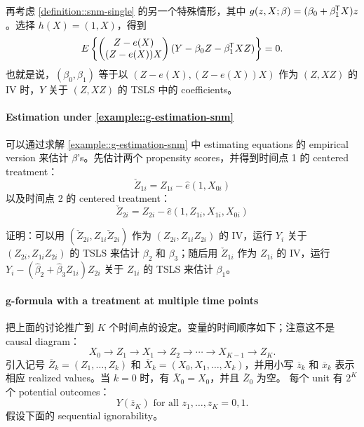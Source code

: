 再考虑 \cref{definition::snm-single} 的另一个特殊情形，其中 $g(z,X;\beta) = (\beta_0 + \beta_1^{\mkern-1.5mu\mathsf{T}} X) z$。选择 $h(X) = (1,X)$，得到
$$
E\left\{   \begin{pmatrix}
Z-e(X)\\
(Z-e(X)) X
\end{pmatrix}  
(Y-  \beta_0 Z - \beta_1^{\mkern-1.5mu\mathsf{T}} XZ) \right\}  = 0.
$$
也就是说，$(\beta_0,\beta_1)$ 等于以 $(Z-e(X),  (Z-e(X)) X )$ 作为 $(Z, XZ)$ 的 IV 时，$Y$ 关于 $(Z, XZ)$ 的 TSLS 中的 coefficients。



\paragraph{Estimation under \cref{example::g-estimation-snm}}\label{problem::snm-estimation-example}
 

可以通过求解 \cref{example::g-estimation-snm} 中 estimating equations 的 empirical version 来估计 $\beta$'s。先估计两个 propensity scores，并得到时间点 1 的 centered treatment：
$$
\check{Z}_{1i} = Z_{1i} - \hat{e}(1,X_{0i})
$$
以及时间点 2 的 centered treatment：
 $$
 \check{Z}_{2i} = Z_{2i}  - \hat{e}(1, Z_{1i}, X_{1i}, X_{0i})
 $$
 


证明：可以用 $( \check{Z}_{2i} ,  Z_{1i}\check{Z}_{2i} )$ 作为 $(Z_{2i}, Z_{1i} Z_{2i} )$ 的 IV，运行 $Y_i$ 关于 $(Z_{2i}, Z_{1i} Z_{2i} )$ 的 TSLS 来估计 $\beta_2$ 和 $\beta_3$；随后用 $\check{Z}_{1i} $ 作为 $Z_{1i}$ 的 IV，运行 $Y_i - (\hat{\beta}_2+\hat{\beta}_3 Z_{1i}) Z_{2i}$ 关于 $Z_{1i}$ 的 TSLS 来估计 $\beta_1$。
 
 
 
 
\paragraph{g-formula with a treatment at multiple time points}\label{problem::g-formula-multiple-time}



把上面的讨论推广到 $K$ 个时间点的设定。变量的时间顺序如下；注意这不是 causal diagram：
$$
X_0 \rightarrow Z_1 \rightarrow X_1 \rightarrow Z_2 \rightarrow \cdots  \rightarrow  X_{K-1}  \rightarrow Z_K .
$$
引入记号 $\overline{Z}_k = (Z_1, \ldots, Z_k)$ 和 $\overline{X}_k = (X_0, X_1, \ldots, X_k)$，并用小写 $\overline{z}_k $ 和 $\overline{x}_k$ 表示相应 realized values。当 $k=0$ 时，有 $\overline{X}_0 = X_0$，并且 $\overline{Z}_0$ 为空。
每个 unit 有 $2^K$ 个 potential outcomes：
$$
Y(\overline{z}_K) \text{ for all } z_1,\ldots, z_K = 0,1.
$$
假设下面的 sequential ignorability。

